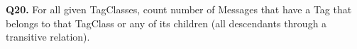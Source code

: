 \textbf{Q20.}
For all given TagClasses, count number of Messages that have a Tag that
belongs to that TagClass or any of its children (all descendants through
a transitive relation).
